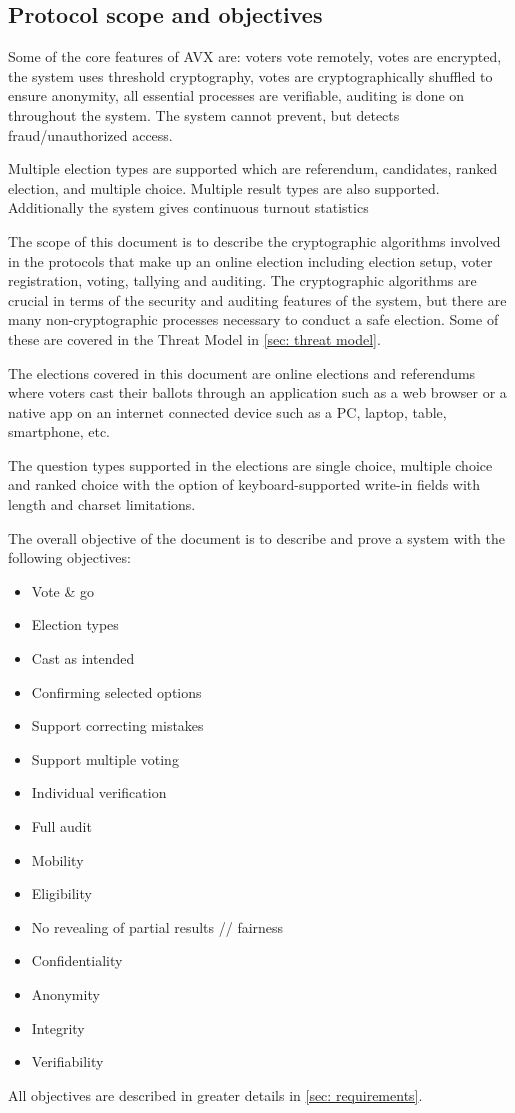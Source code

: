 \subsection{Protocol scope and objectives}
Some of the core features of AVX are: voters vote remotely, votes are encrypted, the system uses threshold cryptography, votes are cryptographically shuffled to ensure anonymity, all essential processes are verifiable, auditing is done on throughout the system. The system cannot prevent, but detects fraud/unauthorized access.

Multiple election types are supported which are referendum, candidates, ranked election, and multiple choice. Multiple result types are also supported. Additionally the system gives continuous turnout statistics

The scope of this document is to describe the cryptographic algorithms involved in the protocols that make up an online election including election setup, voter registration, voting, tallying and auditing. The cryptographic algorithms are crucial in terms of the security and auditing features of the system, but there are many non-cryptographic processes necessary to conduct a safe election. Some of these are covered in the Threat Model in \cref{sec: threat model}.

The elections covered in this document are online elections and referendums where voters cast their ballots through an application such as a web browser or a native app on an internet connected device such as a PC, laptop, table, smartphone, etc.

The question types supported in the elections are single choice, multiple choice and ranked choice with the option of keyboard-supported write-in fields with length and charset limitations.

The overall objective of the document is to describe and prove a system with the following objectives:

\begin{itemize}
    \item Vote \& go
    \item Election types
    \item Cast as intended
    \item Confirming selected options
    \item Support correcting mistakes
    \item Support multiple voting
    \item Individual verification
    \item Full audit

    \item Mobility

    \item Eligibility
    \item No revealing of partial results // fairness
    \item Confidentiality
    \item Anonymity
    \item Integrity
    \item Verifiability
\end{itemize}

All objectives are described in greater details in \cref{sec: requirements}.
